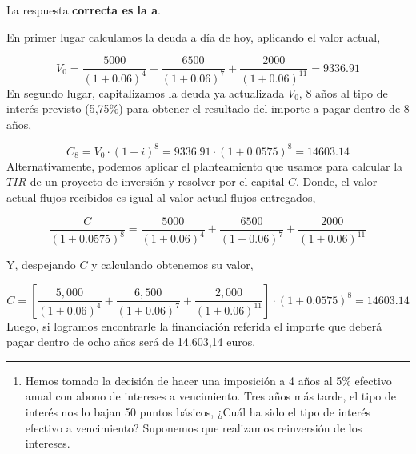 \documentclass[
  letterpaper,
  DIV=11,
  numbers=noendperiod]{scrreprt}
\providecommand{\tightlist}{%
  \setlength{\itemsep}{0pt}\setlength{\parskip}{0pt}}\usepackage{longtable,booktabs,array}
\begin{document}
\begin{tcolorbox}[enhanced jigsaw, left=2mm, opacityback=0, colback=white, breakable, arc=.35mm, bottomrule=.15mm, rightrule=.15mm, toprule=.15mm, leftrule=.75mm, colframe=quarto-callout-tip-color-frame]
\begin{minipage}[t]{5.5mm}
\textcolor{quarto-callout-tip-color}{\faLightbulb}
\end{minipage}%
\begin{minipage}[t]{\textwidth - 5.5mm}

La respuesta \textbf{correcta es la a}.

En primer lugar calculamos la deuda a día de hoy, aplicando el valor
actual,

\[V_0=\frac{5000}{\left(1+0.06\right)^4}+\frac{6500}{\left(1+0.06\right)^7}+\frac{2000}{\left(1+0.06\right)^{11}}=9336.91\]
En segundo lugar, capitalizamos la deuda ya actualizada \(V_0\), 8 años
al tipo de interés previsto (5,75\%) para obtener el resultado del
importe a pagar dentro de 8 años,

\[C_8=V_0\cdot\left(1+i\right)^8=9336.91\cdot\left(1+0.0575\right)^8=14603.14\]
Alternativamente, podemos aplicar el planteamiento que usamos para
calcular la \(TIR\) de un proyecto de inversión y resolver por el
capital \(C\). Donde, el valor actual flujos recibidos es igual al valor
actual flujos entregados,

\[\frac{C}{(1+0.0575)^8}=\frac{5000}{\left(1+0.06\right)^4}+\frac{6500}{\left(1+0.06\right)^7}+\frac{2000}{\left(1+0.06\right)^{11}}\]

Y, despejando \(C\) y calculando obtenemos su valor,

\[C=\left[{\frac{5,000}{\left(1+0.06\right)^4}+\frac{6,500}{\left(1+0.06\right)^7}+\frac{2,000}{\left(1+0.06\right)^{11}} }\right]\cdot(1+0.0575)^8=14603.14\]
Luego, si logramos encontrarle la financiación referida el importe que
deberá pagar dentro de ocho años será de 14.603,14 euros.

\end{minipage}%
\end{tcolorbox}

\begin{center}\rule{0.5\linewidth}{0.5pt}\end{center}

\begin{enumerate}
\def\labelenumi{\arabic{enumi}.}
\setcounter{enumi}{20}
\tightlist
\item
  Hemos tomado la decisión de hacer una imposición a 4 años al 5\%
  efectivo anual con abono de intereses a vencimiento. Tres años más
  tarde, el tipo de interés nos lo bajan 50 puntos básicos, ¿Cuál ha
  sido el tipo de interés efectivo a vencimiento? Suponemos que
  realizamos reinversión de los intereses.
\end{enumerate}
\end{document}
